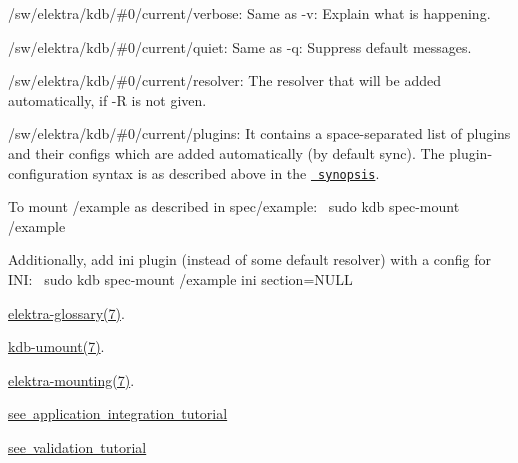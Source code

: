 \begin{DoxyItemize}
\item {\ttfamily /sw/elektra/kdb/\#0/current/verbose}\+: Same as {\ttfamily -\/v}\+: Explain what is happening.
\item {\ttfamily /sw/elektra/kdb/\#0/current/quiet}\+: Same as {\ttfamily -\/q}\+: Suppress default messages.
\item {\ttfamily /sw/elektra/kdb/\#0/current/resolver}\+: The resolver that will be added automatically, if {\ttfamily -\/R} is not given.
\item {\ttfamily /sw/elektra/kdb/\#0/current/plugins}\+: It contains a space-\/separated list of plugins and their configs which are added automatically (by default sync). The plugin-\/configuration syntax is as described above in the \href{\#SYNOPSIS}{\texttt{ synopsis}}.
\end{DoxyItemize}

To mount /example as described in {\ttfamily spec/example}\+:~\newline
 {\ttfamily sudo kdb spec-\/mount /example}

Additionally, add {\ttfamily ini} plugin (instead of some default resolver) with a config for I\+NI\+:~\newline
 {\ttfamily sudo kdb spec-\/mount /example ini section=N\+U\+LL}


\begin{DoxyItemize}
\item \mbox{\hyperlink{doc_help_elektra-glossary_md}{elektra-\/glossary(7)}}.
\item \mbox{\hyperlink{doc_help_kdb-umount_md}{kdb-\/umount(7)}}.
\item \mbox{\hyperlink{doc_help_elektra-mounting_md}{elektra-\/mounting(7)}}.
\item \mbox{\hyperlink{doc_tutorials_application-integration_md}{see application integration tutorial}}
\item \mbox{\hyperlink{validation.md_doc_tutorials_validation_md}{see validation tutorial}} 
\end{DoxyItemize}